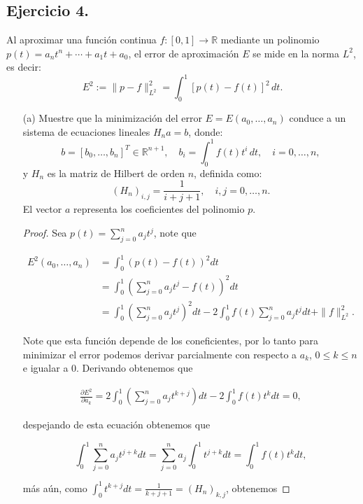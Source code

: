 
\subsection*{Ejercicio 4.}
Al aproximar una función continua $f : [0, 1] \to \mathbb{R}$ mediante un polinomio $p(t) = a_n t^n + \cdots + a_1 t + a_0$, el error de aproximación $E$ se mide en la norma $L^2$, es decir:
\[
E^2 := \|p - f\|_{L^2}^2 = \int_0^1 [p(t) - f(t)]^2 \, dt.
\]

\begin{enumerate}
    \item[(a)] Muestre que la minimización del error $E = E(a_0, \ldots, a_n)$ conduce a un sistema de ecuaciones lineales $H_n a = b$, donde:
    \[
    b = [b_0, \ldots, b_n]^T \in \mathbb{R}^{n+1}, \quad b_i = \int_0^1 f(t)t^i \, dt, \quad i = 0, \ldots, n,
    \]
    y $H_n$ es la matriz de Hilbert de orden $n$, definida como:
    \[
    (H_n)_{i,j} = \frac{1}{i + j + 1}, \quad i, j = 0, \ldots, n.
    \]
    El vector $a$ representa los coeficientes del polinomio $p$.\\

    \begin{proof}
    Sea $p(t)=\displaystyle\sum_{j=0}^{n} a_jt^j$, note que 

    \begin{align*}
        E^2(a_0,\ldots,a_n)&=\int_0^1\left(p(t)-f(t)\right)^2dt\\
        &=\int_0^1\left(\sum_{j=0}^{n} a_jt^j-f(t)\right)^2dt\\
        &=\int_0^1\left(\sum_{j=0}^{n} a_jt^j\right)^2dt-2\int_0^1f(t)\sum_{j=0}^{n} a_jt^j dt+\|f\|_{L^2}^2
    .\end{align*}

    Note que esta función depende de los coneficientes, por lo tanto para minimizar el error podemos derivar parcialmente con respecto a $a_k$, $0\leq k\leq n$ e igualar a 0. Derivando obtenemos que

    \begin{align*}
        \frac{\partial E^2}{\partial a_k}=2\int_0^1\left(\sum_{j=0}^{n} a_jt^{k+j}\right)dt-2\int_0^1f(t)t^kdt=0 
    ,\end{align*}
    
    despejando de esta ecuación obtenemos que

    $$\int_0^1\sum_{j=0}^{n} a_jt^{j+k}dt=\sum_{j=0}^{n} a_j\int_0^1t^{j+k}dt=\int_0^1f(t)t^k dt,$$

    más aún, como $\displaystyle\int_0^1t^{k+j}dt=\frac{1}{k+j+1}=(H_n)_{k,j}$, obtenemos


\end{proof}
\end{enumerate}
